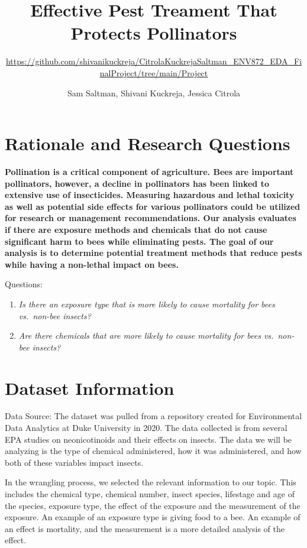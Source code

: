 \documentclass[
  12pt,
]{article}
\title{Effective Pest Treament That Protects Pollinators}
\subtitle{\url{https://github.com/shivanikuckreja/CitrolaKuckrejaSaltman_ENV872_EDA_FinalProject/tree/main/Project}}
\author{Sam Saltman, Shivani Kuckreja, Jessica Citrola}
\date{}
\begin{document}
\maketitle

\newpage
\tableofcontents 
\newpage
\listoftables 
\newpage
\listoffigures 
\newpage

\hypertarget{rationale-and-research-questions}{%
\section{Rationale and Research
Questions}\label{rationale-and-research-questions}}

\textbf{Pollination is a critical component of agriculture. Bees are
important pollinators, however, a decline in pollinators has been linked
to extensive use of insecticides. Measuring hazardous and lethal
toxicity as well as potential side effects for various pollinators could
be utilized for research or management recommendations. Our analysis
evaluates if there are exposure methods and chemicals that do not cause
significant harm to bees while eliminating pests. The goal of our
analysis is to determine potential treatment methods that reduce pests
while having a non-lethal impact on bees.}

Questions:

\begin{enumerate}
\def\labelenumi{\arabic{enumi}.}
\item
  \emph{Is there an exposure type that is more likely to cause mortality
  for bees vs.~non-bee insects?}
\item
  \emph{Are there chemicals that are more likely to cause mortality for
  bees vs.~non-bee insects?}
\end{enumerate}

\newpage

\hypertarget{dataset-information}{%
\section{Dataset Information}\label{dataset-information}}

Data Source: The dataset was pulled from a repository created for
Environmental Data Analytics at Duke University in 2020. The data
collected is from several EPA studies on neonicotinoids and their
effects on insects. The data we will be analyzing is the type of
chemical administered, how it was administered, and how both of these
variables impact insects.

In the wrangling process, we selected the relevant information to our
topic. This includes the chemical type, chemical number, insect species,
lifestage and age of the species, exposure type, the effect of the
exposure and the measurement of the exposure. An example of an exposure
type is giving food to a bee. An example of an effect is mortality, and
the measurement is a more detailed analysis of the effect.
\end{document}
